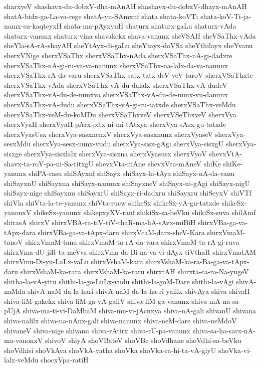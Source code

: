 {sharxyeV
shashavx-du-dobxV-dha-mAnAH
shashavx-du-dobxV-dhayx-mAnAH
shatA-bidx-ga-La-va-rege
shatA-yu-SAmxnf
shata
shata-koVTi
shata-koV-Ti-ja-namx-su-kaqteyxH
shata-ma-pAyxyuH
shaturx
shaturx-gaLu
shaturx-vAda
shaturx-vanunx
shaturx-vina
shavakekx
shava-vanunx
sheVSAH
sheVSaThx-vAda
sheYla-sA-rA-shayAH
sheYtAyx-di-gaLu
sheYtayx-doVSa
sheYthilayx
sheYvanu
sherxVNige
sherxVSaThx
sherxVSaThx-nAda
sherxVSaThx-nA-gi-dadxre
sherxVSaThx-nA-gi-ru-va-va-nanunx
sherxVSaThx-na-lalx-da-va-nanunx
sherxVSaThx-rA-da-varu
sherxVSaThx-satx-tatx-deV-veV-taroV
sherxVSaThxte
sherxVSaThx-vAda
sherxVSaThx-vA-du-dalalx
sherxVSaThx-vA-dudeV
sherxVSaThx-vA-du-de-nunxva
sherxVSaThx-vA-du-de-nunx-vu-danunx
sherxVSaThx-vA-dudu
sherxVSaThx-vA-gi-ru-tatxde
sherxVSaThx-veMdu
sherxVSaThx-veM-du-koMDu
sherxVSaThxveV
sherxVSeThxveV
sherxVya
sherxVyaH
sherxVyaH-pArx-pitx-ni-mi-tAtxya
sherxVya-sAsx-gu-tatxde
sherxVyasUsx
sherxVya-sasxnenxV
sherxVya-sasxnunx
sherxVyaseV
sherxVya-sesxMdu
sherxVya-sesx-nunx-vudu
sherxVya-sisx-gAgi
sherxVya-sisxgU
sherxVya-sisxge
sherxVya-sisxlalx
sherxVya-sisxna
sherxVyasusx
sherxVyoV
shevxVtA-shavx-ta-roV-pa-ni-Sa-titxgU
shevxVta-mAne
shevxVta-mAneV
shiKe
shiKe-yanunx
shiPA-rasu
shiSAyxnf
shiSayx
shiSayx-hi-tAya
shiSayx-nA-da-vanu
shiSayxnU
shiSayxna
shiSayx-nanunx
shiSayxneV
shiSayx-ni-gAgi
shiSayx-nigU
shiSayx-nige
shiSayxnu
shiSayxrU
shiSayx-ri-dadxru
shiSayxru
shiSeyxV
shiVTf
shiVla
shiVta-la-te-yanunx
shiVta-rucw
shikeSx
shikeSx-yA-gu-tatxde
shikeSx-yanonxV
shikeSx-yanunx
shikepxyXV-ranf
shikiSx-sa-beVku
shikiSx-suva
shilAmf
shirasA
shirxV
shirxVBA-ra-tiV-tiV-thaR-ma-hA-sAvx-miBiH
shirxVBa-ga-va-tApx-dara
shirxVBa-ga-va-tApx-daru
shirxVcaM-darx-sheV-Kara
shirxVmaM-tanoV
shirxVmaM-tanu
shirxVmaM-ta-rA-da-vara
shirxVmaM-ta-rA-gi-ruva
shirxVma-dU-jiR-ta-meVva
shirxVma-da-Bi-na-va-vi-dAyx-tiVthaR
shirxVmatAM
shirxVmu-Di-yu-LaLx-vaLu
shirxVshaM-kara
shirxVshaM-ka-ra-Ba-ga-va-tApx-daru
shirxVshaM-ka-rara
shirxVshaM-ka-raru
shirxtAH
shirxta-ca-ra-Na-yugeV
shitha-la-vA-yitu
shithi-la-go-LuLx-vudu
shithi-la-goM-Dare
shithi-la-vAgi
shivA-naMda
shivA-naM-da-la-hari
shivA-naM-da-la-ha-ri-yalilx
shivAya
shiva
shivaH
shiva-liM-gakekx
shiva-liM-ga-vA-galiV
shiva-liM-ga-vanunx
shiva-mA-na-sa-pUjA
shiva-ma-ti-vi-DaMbaM
shiva-mu-vi-jAcnxya
shiva-nA-gali
shivanU
shivana
shiva-nalilx
shiva-na-nAnx-gali
shiva-nanunx
shiva-neM-dare
shiva-neMdoV
shivaneV
shiva-nige
shivanu
shiva-rAtirx
shiva-rU-pa-vanunx
shiva-sa-ha-sarx-nA-ma-vanonxV
shivoV
shiyA
shoVBateV
shoVBe
shoVdhane
shoVdhi-sa-beVku
shoVdhisi
shoVkAya
shoVkA-yatha
shoVka
shoVka-ra-hi-ta-vA-giyU
shoVka-vi-lalx-veMdu
shocxVpa-ratiH
}
